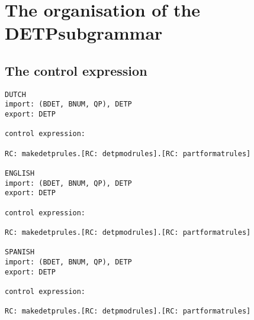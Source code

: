 \section{The organisation of the DETPsubgrammar}
\subsection{The control expression}

\begin{verbatim}
DUTCH
import: (BDET, BNUM, QP), DETP
export: DETP

control expression:

RC: makedetprules.[RC: detpmodrules].[RC: partformatrules]

ENGLISH
import: (BDET, BNUM, QP), DETP
export: DETP

control expression:

RC: makedetprules.[RC: detpmodrules].[RC: partformatrules]

SPANISH
import: (BDET, BNUM, QP), DETP
export: DETP

control expression:

RC: makedetprules.[RC: detpmodrules].[RC: partformatrules]
\end{verbatim}

